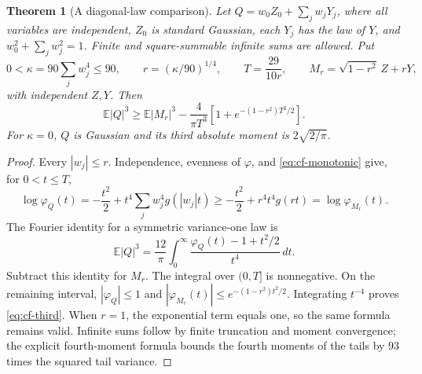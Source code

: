 \documentclass[11pt]{article}
\newtheorem{theorem}{Theorem}
\newcommand{\E}{\mathbb E}
\begin{document}
\begin{theorem}[A diagonal-law comparison]\label{thm:cf-law}
Let $Q=w_0Z_0+\sum_jw_jY_j$, where all variables are independent, $Z_0$ is standard Gaussian, each $Y_j$ has the law of $Y$, and $w_0^2+\sum_jw_j^2=1$. Finite and square-summable infinite sums are allowed. Put
\begin{equation*}
 0<\kappa=90\sum_jw_j^4\le90,\qquad
 r=(\kappa/90)^{1/4},\qquad T=\frac{29}{10r},
 \qquad M_r=\sqrt{1-r^2}\,Z+rY,
\end{equation*}
with independent $Z,Y$. Then
\begin{equation}\label{eq:cf-third}
 \E|Q|^3\ge\E|M_r|^3
 -\frac4{\pi T^3}\left[1+e^{-(1-r^2)T^2/2}\right].
\end{equation}
For $\kappa=0$, $Q$ is Gaussian and its third absolute moment is $2\sqrt{2/\pi}$.
\end{theorem}
\begin{proof}
Every $|w_j|\le r$. Independence, evenness of $\varphi$, and \eqref{eq:cf-monotonic} give, for $0<t\le T$,
\begin{equation*}
 \log\varphi_Q(t)=-\frac{t^2}{2}
   +t^4\sum_jw_j^4g(|w_j|t)
 \ge-\frac{t^2}{2}+r^4t^4g(rt)=\log\varphi_{M_r}(t).
\end{equation*}
The Fourier identity for a symmetric variance-one law is
\begin{equation*}
 \E|Q|^3=\frac{12}{\pi}\int_0^\infty
 \frac{\varphi_Q(t)-1+t^2/2}{t^4}\,dt.
\end{equation*}
Subtract this identity for $M_r$. The integral over $(0,T]$ is nonnegative. On the remaining interval, $|\varphi_Q|\le1$ and $|\varphi_{M_r}(t)|\le e^{-(1-r^2)t^2/2}$. Integrating $t^{-4}$ proves \eqref{eq:cf-third}. When $r=1$, the exponential term equals one, so the same formula remains valid. Infinite sums follow by finite truncation and moment convergence; the explicit fourth-moment formula bounds the fourth moments of the tails by $93$ times the squared tail variance.
\end{proof}
\end{document}
